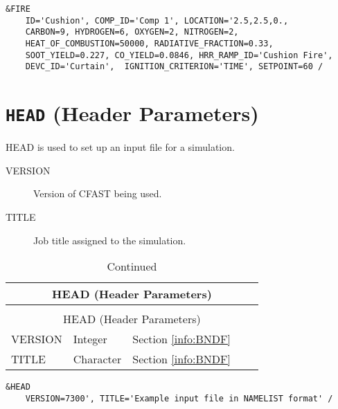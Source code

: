 \begin{lstlisting}
&FIRE 
	ID='Cushion', COMP_ID='Comp 1', LOCATION='2.5,2.5,0.,
	CARBON=9, HYDROGEN=6, OXYGEN=2, NITROGEN=2,
	HEAT_OF_COMBUSTION=50000, RADIATIVE_FRACTION=0.33,
	SOOT_YIELD=0.227, CO_YIELD=0.0846, HRR_RAMP_ID='Cushion Fire',
	DEVC_ID='Curtain',  IGNITION_CRITERION='TIME', SETPOINT=60 /
\end{lstlisting}

\vspace{\baselineskip}



\section{\texorpdfstring{{\tt HEAD}}{HEAD} (Header Parameters)}

HEAD is used to set up an input file for a simulation.

\begin{adjustwidth}{1cm}{0cm}
\begin{description}
  \item[VERSION] Version of CFAST being used.
  \item[TITLE] Job title assigned to the simulation.
\end{description}
\end{adjustwidth}

\vspace{\baselineskip}

\begin{longtable}{@{\extracolsep{\fill}}|l|l|l|l|l|}
\caption[Boundary file parameters ({\ct SLCF} namelist group)]{For more information see Section~\ref{info:BNDF}.}
\label{tbl:HEAD} \\
\hline
\multicolumn{5}{|c|}{{\ct HEAD} (Header Parameters)} \\
\hline \hline
\endfirsthead
\caption[]{Continued} \\
\hline
\multicolumn{5}{|c|}{{\ct HEAD} (Header Parameters)} \\
\hline \hline
\endhead
{\ct VERSION}         & Integer     & Section \ref{info:BNDF}                 &           &                 \\ \hline
{\ct TITLE}           & Character   & Section \ref{info:BNDF}                 &           &                 \\ \hline
\end{longtable}

\begin{lstlisting}
&HEAD 
	VERSION=7300', TITLE='Example input file in NAMELIST format' /
\end{lstlisting}

